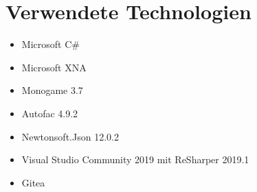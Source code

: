 \section{Verwendete Technologien}


\begin{itemize}[leftmargin=*, nosep]
    \item Microsoft C\#
    \item Microsoft XNA
    \item Monogame 3.7
    \item Autofac 4.9.2
    \item Newtonsoft.Json 12.0.2
    \item Visual Studio Community 2019 mit ReSharper 2019.1
    \item Gitea
\end{itemize}
